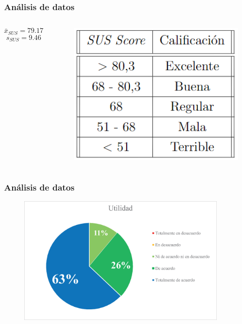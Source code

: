\documentclass[9pt]{beamer}
\begin{document}
    \begin{frame}      
        \frametitle{Análisis de datos}
       
       \begin{columns}
            $$ \bar{x}_{SUS} = 79.17$$
            $$ s_{SUS} = 9.46$$
    
            \begin{figure}
                \centering
                \includegraphics[width=\textwidth]{assets/Evaluacion/SUS_Score.png}
            \end{figure}
       \end{columns}
    \end{frame}

    \begin{frame}      
        \frametitle{Análisis de datos}
        \begin{figure}
            \centering
            \includegraphics[width=0.9\textwidth]{assets/Evaluacion/utility.eps}
        \end{figure}
    \end{frame}
\end{document}
